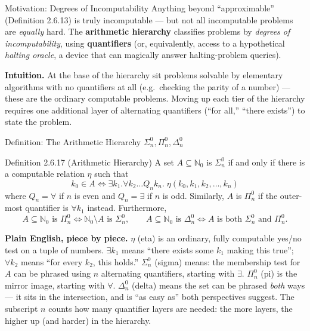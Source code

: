 \documentclass[aspectratio=169,10pt]{beamer}
\newcommand{\N}{\mathbb{N}}
\begin{document}
\begin{frame}{Motivation: Degrees of Incomputability}
  Anything beyond ``approximable'' (Definition 2.6.13) is truly incomputable
  --- but not all incomputable problems are \emph{equally} hard. The
  \textbf{arithmetic hierarchy} classifies problems by \emph{degrees of
  incomputability}, using \textbf{quantifiers} (or, equivalently, access to a
  hypothetical \emph{halting oracle}, a device that can magically answer
  halting-problem queries).

  \vspace{2mm}
  \textbf{Intuition.} At the base of the hierarchy sit problems solvable by
  elementary algorithms with no quantifiers at all (e.g.\ checking the parity
  of a number) --- these are the ordinary computable problems. Moving up each
  tier of the hierarchy requires one additional layer of alternating
  quantifiers (``for all,'' ``there exists'') to state the problem.
\end{frame}

\begin{frame}{Definition: The Arithmetic Hierarchy $\Sigma_n^0, \Pi_n^0, \Delta_n^0$}
  \begin{block}{Definition 2.6.17 (Arithmetic Hierarchy)}
    A set $A \subseteq \N_0$ is $\Sigma_n^0$ if and only if there is a
    computable relation $\eta$ such that
    \[
      k_0 \in A \iff \exists k_1 . \forall k_2 \dots Q_n k_n . \; \eta(k_0,k_1,k_2,\dots,k_n)
    \]
    where $Q_n = \forall$ if $n$ is even and $Q_n = \exists$ if $n$ is odd.
    Similarly, $A$ is $\Pi_n^0$ if the outer-most quantifier is $\forall k_1$
    instead. Furthermore,
    \[
      A \subseteq \N_0 \text{ is } \Pi_n^0 \iff \N_0 \setminus A \text{ is } \Sigma_n^0, \qquad
      A \subseteq \N_0 \text{ is } \Delta_n^0 \iff A \text{ is both } \Sigma_n^0 \text{ and } \Pi_n^0.
    \]
  \end{block}
  \textbf{Plain English, piece by piece.} $\eta$ (eta) is an ordinary,
  fully computable yes/no test on a tuple of numbers. $\exists k_1$ means
  ``there exists some $k_1$ making this true''; $\forall k_2$ means ``for
  every $k_2$, this holds.'' $\Sigma_n^0$ (sigma) means: the membership test
  for $A$ can be phrased using $n$ alternating quantifiers, starting with
  $\exists$. $\Pi_n^0$ (pi) is the mirror image, starting with $\forall$.
  $\Delta_n^0$ (delta) means the set can be phrased \emph{both} ways --- it
  sits in the intersection, and is ``as easy as'' both perspectives suggest.
  The subscript $n$ counts how many quantifier layers are needed: the more
  layers, the higher up (and harder) in the hierarchy.
\end{frame}
\end{document}

